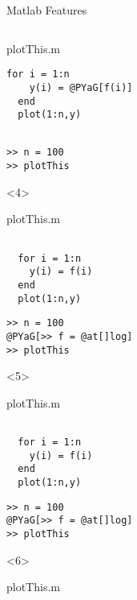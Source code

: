 \begin{frame}[fragile]{Matlab Features}
\begin{columns}
\begin{column}[T]{5cm}
\begin{onlyenv}
\begin{block}{plotThis.m}
\begin{Verbatim}[commandchars=@\[\]]
  for i = 1:n
    y(i) = @PYaG[f(i)]
  end
  plot(1:n,y)
          \end{Verbatim}
        \end{block}
          \begin{Verbatim}[commandchars=@\[\]]

>> n = 100
>> plotThis
        \end{Verbatim}
      \end{onlyenv}
      \begin{onlyenv}<4>
        \begin{block}{plotThis.m}
          \begin{Verbatim}[commandchars=@\[\]]

  for i = 1:n
    y(i) = f(i)
  end
  plot(1:n,y)
          \end{Verbatim}
        \end{block}
          \begin{Verbatim}[commandchars=@\[\]]
>> n = 100
@PYaG[>> f = @at[]log]
>> plotThis
        \end{Verbatim}
      \end{onlyenv}
      \begin{onlyenv}<5>
        \begin{block}{plotThis.m}
          \begin{Verbatim}[commandchars=@\[\]]

  for i = 1:n
    y(i) = f(i)
  end
  plot(1:n,y)
          \end{Verbatim}
        \end{block}
          \begin{Verbatim}[commandchars=@\[\]]
>> n = 100
@PYaG[>> f = @at[]log]
>> plotThis
        \end{Verbatim}
      \end{onlyenv}
      \begin{onlyenv}<6>
        \begin{block}{plotThis.m}
          \begin{Verbatim}[commandchars=@\[\]]


\end{Verbatim}
\end{block}
\end{onlyenv}
\end{column}
\end{columns}
\end{frame}
